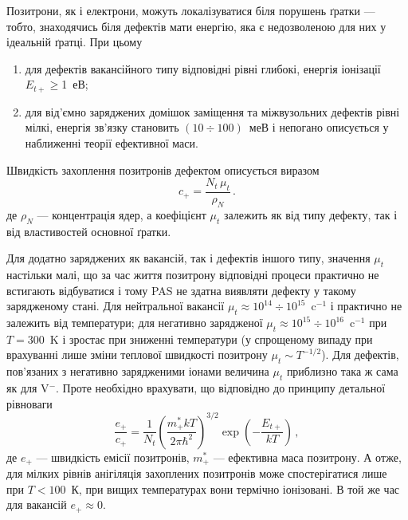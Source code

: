 \documentclass[10pt,a5paper,titlepage,oneside]{book}
\numberwithin{equation}{part}
\begin{document}
Позитрони, як і електрони, можуть локалізуватися біля порушень ґратки --- тобто, знаходячись біля дефектів мати енергію,
яка є недозволеною для них у ідеальній ґратці.
При цьому
\begin{enumerate}[label=\asbuk*),leftmargin=0em,itemindent=1.5em]
\item для дефектів вакансійного типу відповідні рівні глибокі, енергія іонізації $E_{t+}\geq$1~еВ;
\item для від'ємно заряджених домішок заміщення та міжвузольних дефектів рівні мілкі,
 енергія зв'язку становить $(10\div100)$~меВ і
непогано описується у наближенні теорії ефективної маси.
\end{enumerate}

Швидкість захоплення позитронів дефектом описується виразом
\begin{equation}\label{PASc}
c_+=\frac{N_t\,\mu_t}{\rho_N}\,.
\end{equation}
де
$\rho_N$ --- концентрація ядер, 
а коефіцієнт $\mu_t$ залежить як від типу дефекту, так і від властивостей основної ґратки. 

Для додатно заряджених як вакансій, так і дефектів іншого типу, значення $\mu_t$
настільки малі, що за час життя позитрону відповідні процеси практично не встигають відбуватися і тому
PAS не здатна виявляти дефекту у такому зарядженому стані.
Для нейтральної вакансії $\mu_t\approx10^{14}\div10^{15}$~c$^{-1}$ і практично не залежить від температури;
для негативно зарядженої $\mu_t\approx10^{15}\div10^{16}$~c$^{-1}$ при $T=300$~K і зростає при
зниженні температури (у спрощеному випаду при врахуванні лише зміни теплової швидкості
позитрону $\mu_t\sim T^{-1/2}$).
Для дефектів, пов'язаних з негативно зарядженими іонами величина $\mu_t$ приблизно така ж сама
як для V$^-$.
Проте необхідно врахувати, що відповідно до принципу детальної рівноваги
\begin{equation}\label{PASce}
\frac{e_+}{c_+}=\frac{1}{N_t}\left(\frac{m_+^*kT}{2\pi\hbar^2}\right)^{3/2}\exp\left(-\frac{E_{t+}}{kT}\right)\,,
\end{equation}
де
$e_+$ --- швидкість емісії позитронів,
$m_+^*$ --- ефективна маса позитрону.
А отже, для мілких рівнів анігіляція захоплених позитронів може спостерігатися лише при
$T<100$~К, при вищих температурах вони термічно іонізовані.
В той же час для вакансій $e_+\approx0$.
\end{document}
